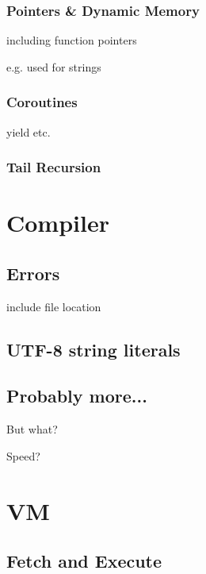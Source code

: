             \subsubsection{Pointers \& Dynamic Memory}
                
                including function pointers
                
                e.g. used for strings
                
            \subsubsection{Coroutines}
            	
            	yield etc.
            
            \subsubsection{Tail Recursion}
            
    
    \section{Compiler}
        
        \subsection{Errors}
            
            include file location
            
        \subsection{UTF-8 string literals}
            
        \subsection{Probably more...}
            
            But what?
            
            Speed?
        
    \section{VM}
        
        \subsection{Fetch and Execute}
            
